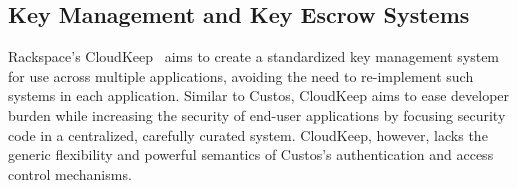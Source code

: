 \subsection{Key Management and Key Escrow Systems}
\cite{Blaze1996, Denning1996}
\cite{cloudkeep-presentation, cloudkeep}
\cite{gazzang, porticor, Rosen2012}
\cite{amazon-hsm}

Rackspace's CloudKeep~\cite{cloudkeep} aims to create a standardized
key management system for use across multiple applications, avoiding
the need to re-implement such systems in each application. Similar to
Custos, CloudKeep aims to ease developer burden while increasing the
security of end-user applications by focusing security code in a
centralized, carefully curated system. CloudKeep, however, lacks the
generic flexibility and powerful semantics of Custos's authentication
and access control mechanisms.
